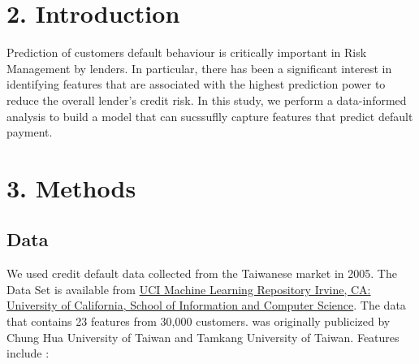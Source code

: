 \documentclass[11pt]{article}
\begin{document}
    \hypertarget{introduction}{%
\section{2. Introduction }\label{introduction}}

Prediction of customers default behaviour is critically important in
Risk Management by lenders. In particular, there has been a significant
interest in identifying features that are associated with the highest
prediction power to reduce the overall lender's credit risk. In this
study, we perform a data-informed analysis to build a model that can
sucssuflly capture features that predict default payment.

    \hypertarget{methods}{%
\section{3. Methods }\label{methods}}

\hypertarget{data}{%
\subsection{Data}\label{data}}

We used credit default data collected from the Taiwanese market in 2005.
The Data Set is available from
\href{https://archive.ics.uci.edu/ml/datasets/default+of+credit+card+clients}{UCI
Machine Learning Repository Irvine, CA: University of California, School
of Information and Computer Science}. The data that contains 23 features
from 30,000 customers. was originally publicized by Chung Hua University
of Taiwan and Tamkang University of Taiwan. Features include :
\end{document}

